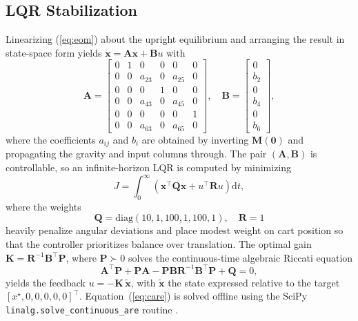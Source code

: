 \documentclass[conference]{IEEEtran}
\begin{document}
\subsection{LQR Stabilization}\label{ssec:lqr}
Linearizing (\ref{eq:eom}) about the upright equilibrium and arranging the result in state-space form yields $\dot{\mathbf{x}} = \mathbf{A}\mathbf{x}+\mathbf{B}u$ with
\begin{equation}
\mathbf{A}=
\begin{bmatrix}
0 & 1 & 0 & 0 & 0 & 0\\
0 & 0 & a_{23} & 0 & a_{25} & 0\\
0 & 0 & 0 & 1 & 0 & 0\\
0 & 0 & a_{43} & 0 & a_{45} & 0\\
0 & 0 & 0 & 0 & 0 & 1\\
0 & 0 & a_{63} & 0 & a_{65} & 0
\end{bmatrix},\quad
\mathbf{B}=
\begin{bmatrix}0\\b_2\\0\\b_4\\0\\b_6\end{bmatrix},
\end{equation}
where the coefficients $a_{ij}$ and $b_i$ are obtained by inverting $\mathbf{M}(\mathbf{0})$ and propagating the gravity and input columns through. The pair $(\mathbf{A},\mathbf{B})$ is controllable, so an infinite-horizon LQR is computed by minimizing
\begin{equation}
J = \int_0^\infty \left( \mathbf{x}^{\!\top}\mathbf{Q}\mathbf{x} + u^{\!\top}\mathbf{R}u \right) \mathrm{d}t,
\end{equation}
where the weights
\begin{equation}
\mathbf{Q} = \mathrm{diag}(10,1,100,1,100,1),\quad \mathbf{R}=1
\end{equation}
heavily penalize angular deviations and place modest weight on cart position so that the controller prioritizes balance over translation. The optimal gain $\mathbf{K}=\mathbf{R}^{-1}\mathbf{B}^{\!\top}\mathbf{P}$, where $\mathbf{P}\succ 0$ solves the continuous-time algebraic Riccati equation
\begin{equation}
\mathbf{A}^{\!\top}\mathbf{P}+\mathbf{P}\mathbf{A}-\mathbf{P}\mathbf{B}\mathbf{R}^{-1}\mathbf{B}^{\!\top}\mathbf{P}+\mathbf{Q}=0,
\label{eq:care}
\end{equation}
yields the feedback $u=-\mathbf{K}\,\tilde{\mathbf{x}}$, with $\tilde{\mathbf{x}}$ the state expressed relative to the target $[x^\star,0,0,0,0,0]^{\!\top}$. Equation~(\ref{eq:care}) is solved offline using the SciPy \texttt{linalg.solve\_continuous\_are} routine \cite{anderson1990optimal,bryson1975applied}.
\end{document}
